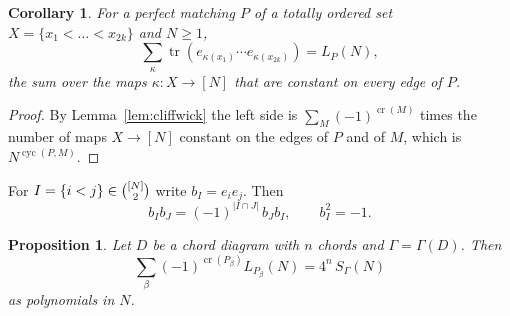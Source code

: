 \documentclass[preprint,12pt]{elsarticle}
\newtheorem{proposition}[theorem]{Proposition}
\newtheorem{corollary}[theorem]{Corollary}
\theoremstyle{definition}
\newcommand{\tr}{\operatorname{tr}}
\newcommand{\cro}{\operatorname{cr}}
\newcommand{\cyc}{\operatorname{cyc}}
\newcommand{\binomset}[2]{\tbinom{#1}{#2}}
\begin{document}
\begin{corollary}\label{cor:colour}
For a perfect matching $P$ of a totally ordered set $X=\{x_1<\dots<x_{2k}\}$ and $N\ge1$,
\[
\sum_\kappa\tr(e_{\kappa(x_1)}\cdots e_{\kappa(x_{2k})})=L_P(N),
\]
the sum over the maps $\kappa\colon X\to[N]$ that are constant on every edge of $P$.
\end{corollary}

\begin{proof}
By Lemma~\ref{lem:cliffwick} the left side is $\sum_M(-1)^{\cro(M)}$ times the number of maps $X\to[N]$ constant on the edges of $P$ and of $M$, which is $N^{\cyc(P,M)}$.
\end{proof}

For $I=\{i<j\}\in\binomset{[N]}{2}$ write $b_I=e_ie_j$. Then
\begin{equation}\label{eq:bivector}
b_Ib_J=(-1)^{|I\cap J|}\,b_Jb_I,\qquad b_I^2=-1 .
\end{equation}

\begin{proposition}\label{prop:clifford}
Let $D$ be a chord diagram with $n$ chords and $\Gamma=\Gamma(D)$. Then
\[
\sum_\beta(-1)^{\cro(P_\beta)}L_{P_\beta}(N)=4^n\,S_\Gamma(N)
\]
as polynomials in $N$.
\end{proposition}
\end{document}
